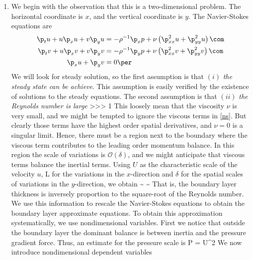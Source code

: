\documentclass[11pt]{article}
\begin{document}
\begin{enumerate}[label=(\alph*)]
    \item We begin with the observation that this is a two-dimensional problem. The horizontal coordinate is $x$, and the vertical coordinate is $y$. The Navier-Stokes equations are
        \begin{align}
            \label{ns}
            \p_t u + u\p_x u + v\p_y u &= -\rho^{-1}\p_x p + \nu  \left(\p^2_{xx}u +\p^2_{yy}u\right)\com\nonumber\\
            \p_t v + u\p_x v + v\p_y v &= -\rho^{-1}\p_y p + \nu  \left(\p^2_{xx}v +\p^2_{yy}v\right)\com\nonumber\\
            \p_x u + \p_y v& = 0\per
        \end{align}
        We will look for steady solution, so the first assumption is that $(i)$ \textit{the steady state can be achieve}. This assumption is easily verified by the existence of solutions to the steady equations. The second assumption is that $(ii)$ \textit{the Reynolds number is large}
        \beq
        \Re {} {} >>> 1\per
        \eeq
        This loosely mean that the viscosity $\nu$ is very small, and we might be tempted to ignore the viscous terms  in \eqref{ns}. But clearly those terms have the highest order spatial derivatives, and $\nu = 0$ is a singular limit. Hence, there must be a region next to the boundary where the viscous term contributes to the leading order momentum balance. In this region the scale of variations is $\mathcal{O(\delta)}$, and we might anticipate that viscous terms balance the inertial terms. Using $U$ as the characteristic scale of the velocity $u$, L for the variations in the $x$-direction and $\delta$ for the spatial scales of variations in the $y$-direction, we obtain
        \beq
        \label{delta}
        \delta \sim {}\com \qquad {} \qquad{} \sim {}\per
        \eeq
    That is, the boundary layer thickness is inversely proportion to the square-root of the Reynolds number. We use this information to rescale the Navier-Stokes equations to obtain the boundary layer approximate equations. To obtain this approximation systematically, we use nondimensional variables. First we notice that outside the boundary layer the dominant balance is between inertia and the pressure gradient force. Thus, an estimate for the pressure scale is
    \beq
    \label{P}
        P = \rho U^2\per
    \eeq
    We now introduce nondimensional dependent variables 
    \beq
    \label{scales}
    \ndu {} {}\com\qquad \ndv {} {}\com\qqand \np {} {}\com

\end{enumerate}
\end{document}
